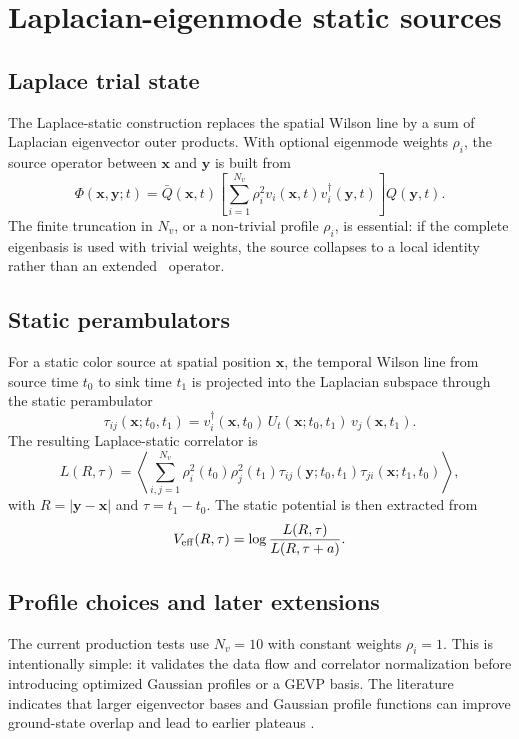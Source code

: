 \chapter{Laplacian-eigenmode static sources}
\label{chap:laplace-sources}

\section{Laplace trial state}
The Laplace-static construction replaces the spatial Wilson line by a sum of Laplacian eigenvector outer products. With optional eigenmode weights \(\rho_i\), the source operator between \(\bm x\) and \(\bm y\) is built from
\begin{equation}
  \Phi(\bm x,\bm y;t)
  = \bar Q(\bm x,t)\left[\sum_{i=1}^{N_v}\rho_i^2 v_i(\bm x,t)v_i^\dagger(\bm y,t)\right]Q(\bm y,t).
  \label{eq:laplace-trial-state}
\end{equation}
The finite truncation in \(N_v\), or a non-trivial profile \(\rho_i\), is essential: if the complete eigenbasis is used with trivial weights, the source collapses to a local identity rather than an extended \QQbar\ operator.

\section{Static perambulators}
For a static color source at spatial position \(\bm x\), the temporal Wilson line from source time \(t_0\) to sink time \(t_1\) is projected into the Laplacian subspace through the static perambulator
\begin{equation}
  \tau_{ij}(\bm x;t_0,t_1)
  = v_i^\dagger(\bm x,t_0)\,U_t(\bm x;t_0,t_1)\,v_j(\bm x,t_1).
  \label{eq:static-perambulator}
\end{equation}
The resulting Laplace-static correlator is
\begin{equation}
  L(R,\tau)=\left\langle\sum_{i,j=1}^{N_v}\rho_i^2(t_0)\rho_j^2(t_1)
  \tau_{ij}(\bm y;t_0,t_1)\tau_{ji}(\bm x;t_1,t_0)\right\rangle,
  \label{eq:laplace-correlator}
\end{equation}
with \(R=|\bm y-\bm x|\) and \(\tau=t_1-t_0\). The static potential is then extracted from
\begin{equation}
  V_{\mathrm{eff}}(R,\tau)=\log\frac{L(R,\tau)}{L(R,\tau+a)}.
  \label{eq:veff-laplace}
\end{equation}

\section{Profile choices and later extensions}
The current production tests use \(N_v=10\) with constant weights \(\rho_i=1\). This is intentionally simple: it validates the data flow and correlator normalization before introducing optimized Gaussian profiles or a GEVP basis. The literature indicates that larger eigenvector bases and Gaussian profile functions can improve ground-state overlap and lead to earlier plateaus \cite{Hoellwieser2023}.

